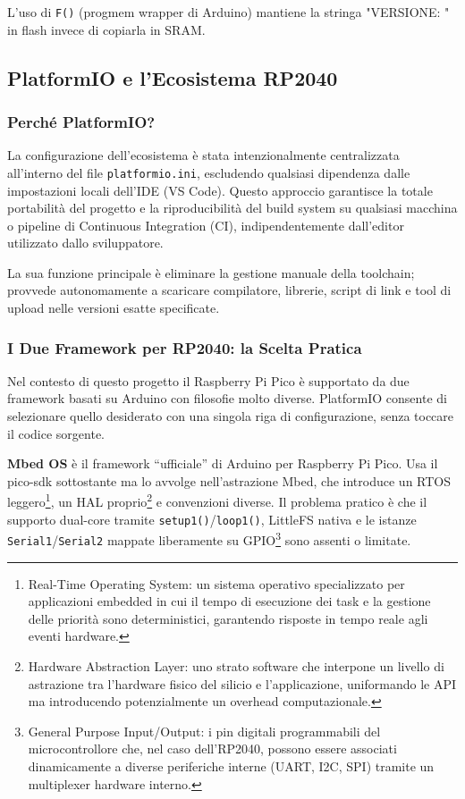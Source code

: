 L'uso di \texttt{F()} (progmem wrapper di Arduino) mantiene la stringa "VERSIONE: " in flash invece di copiarla in SRAM.



\subsection{PlatformIO e l'Ecosistema RP2040}

\subsubsection*{Perché PlatformIO?}

La configurazione dell'ecosistema è stata intenzionalmente centralizzata all'interno del file \texttt{platformio.ini}, escludendo qualsiasi dipendenza dalle impostazioni locali dell'IDE (VS Code). Questo approccio garantisce la totale portabilità del progetto e la riproducibilità del build system su qualsiasi macchina o pipeline di Continuous Integration (CI), indipendentemente dall'editor utilizzato dallo sviluppatore.

La sua funzione principale è eliminare la gestione manuale della toolchain; provvede autonomamente a scaricare compilatore, librerie, script di link e tool di upload nelle versioni esatte specificate.

\subsubsection*{I Due Framework per RP2040: la Scelta Pratica}
Nel contesto di questo progetto il Raspberry Pi Pico è supportato da due framework basati su Arduino con filosofie molto diverse. PlatformIO consente di selezionare quello desiderato con una singola riga di configurazione, senza toccare il codice sorgente.


\textbf{Mbed OS} è il framework ``ufficiale'' di Arduino per Raspberry Pi Pico. Usa il pico-sdk sottostante ma lo avvolge nell'astrazione Mbed, che introduce un RTOS leggero\footnote{Real-Time Operating System: un sistema operativo specializzato per applicazioni embedded in cui il tempo di esecuzione dei task e la gestione delle priorità sono deterministici, garantendo risposte in tempo reale agli eventi hardware.}, un HAL proprio\footnote{Hardware Abstraction Layer: uno strato software che interpone un livello di astrazione tra l'hardware fisico del silicio e l'applicazione, uniformando le API ma introducendo potenzialmente un overhead computazionale.} e convenzioni diverse. Il problema pratico è che il supporto dual-core tramite \texttt{setup1()}/\texttt{loop1()}, LittleFS nativa e le istanze \texttt{Serial1}/\texttt{Serial2} mappate liberamente su GPIO\footnote{General Purpose Input/Output: i pin digitali programmabili del microcontrollore che, nel caso dell'RP2040, possono essere associati dinamicamente a diverse periferiche interne (UART, I2C, SPI) tramite un multiplexer hardware interno.} sono assenti o limitate.

